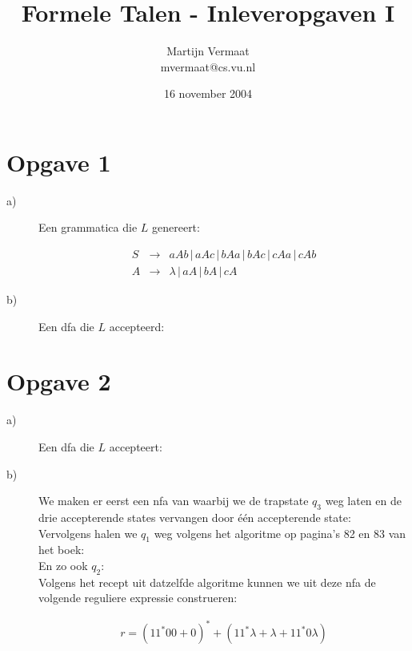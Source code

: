 \documentclass[a4paper,11pt]{article}
\title{Formele Talen - Inleveropgaven I}
\author{
    Martijn Vermaat\\
    mvermaat@cs.vu.nl
}
\date{16 november 2004}
\begin{document}
\maketitle


\section*{Opgave 1}


\begin{description}


\item[a)]

Een grammatica die $L$ genereert:

\begin{eqnarray*}
S & \rightarrow & aAb \, | \, aAc \, | \, bAa \, | \, bAc \, | \, cAa \, | \, cAb \nonumber \\
A & \rightarrow & \lambda \, | \, aA \, | \, bA \, | \, cA \nonumber
\end{eqnarray*}

\item[b)]

Een dfa die $L$ accepteerd:\\[1em]




\end{description}


\section*{Opgave 2}


\begin{description}


\item[a)]

Een dfa die $L$ accepteert:\\[1em]



\item[b)]

We maken er eerst een nfa van waarbij we de trapstate $q_{3}$ weg laten en
de drie accepterende states vervangen door \'e\'en accepterende state:\\[1em]



Vervolgens halen we $q_{1}$ weg volgens het algoritme op pagina's 82 en 83
van het boek:\\[1em]



En zo ook $q_{2}$:\\[1em]



Volgens het recept uit datzelfde algoritme kunnen we uit deze nfa de
volgende reguliere expressie construeren:

\begin{eqnarray*}
r = (11^{*}00 + 0)^{*} + (11^{*}\lambda + \lambda + 11^{*}0\lambda)
\end{eqnarray*}


\end{description}
\end{document}
